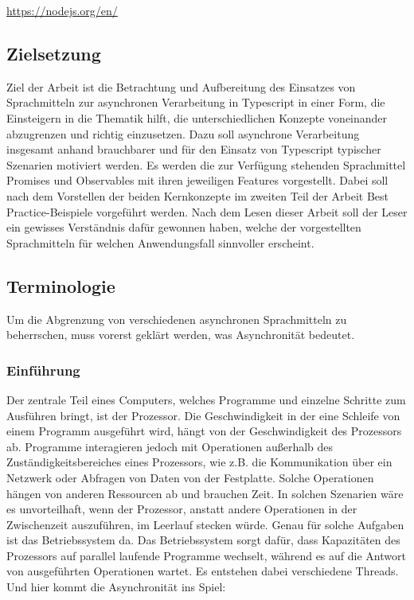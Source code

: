 \begin{center}
\url{https://nodejs.org/en/}
\end{center}

\subsection{Zielsetzung}
Ziel der Arbeit ist die Betrachtung und Aufbereitung des Einsatzes von Sprachmitteln zur asynchronen Verarbeitung in Typescript in einer Form, die Einsteigern in die Thematik hilft, die unterschiedlichen Konzepte voneinander abzugrenzen und richtig einzusetzen. Dazu soll asynchrone Verarbeitung insgesamt anhand brauchbarer und für den Einsatz von Typescript typischer Szenarien motiviert werden. Es werden die zur Verfügung stehenden Sprachmittel Promises und Observables mit ihren jeweiligen Features vorgestellt. Dabei soll nach dem Vorstellen der beiden Kernkonzepte im zweiten Teil der Arbeit \glqq Best Practice\grqq{}-Beispiele vorgeführt werden. Nach dem Lesen dieser Arbeit soll der Leser ein gewisses Verständnis dafür gewonnen haben, welche der vorgestellten Sprachmitteln für welchen Anwendungsfall sinnvoller erscheint. 

\subsection{Terminologie}
Um die Abgrenzung von verschiedenen asynchronen Sprachmitteln zu beherrschen, muss vorerst geklärt werden, was Asynchronität bedeutet.

\subsubsection{Einführung}
Der zentrale Teil eines Computers, welches Programme und einzelne Schritte zum Ausführen bringt, ist der Prozessor. Die Geschwindigkeit in der eine Schleife von einem Programm ausgeführt wird, hängt von der Geschwindigkeit des Prozessors ab. Programme interagieren jedoch mit Operationen außerhalb des Zuständigkeitsbereiches eines Prozessors, wie z.B. die Kommunikation über ein Netzwerk oder Abfragen von Daten von der Festplatte. Solche Operationen hängen von anderen Ressourcen ab und brauchen Zeit. In solchen Szenarien wäre es unvorteilhaft, wenn der Prozessor, anstatt andere Operationen in der Zwischenzeit auszuführen, im Leerlauf stecken würde. Genau für solche Aufgaben ist das Betriebssystem da. Das Betriebssystem sorgt dafür, dass Kapazitäten des Prozessors auf parallel laufende Programme wechselt, während es auf die Antwort von ausgeführten Operationen wartet. Es entstehen dabei verschiedene \glqq Threads\grqq{}. Und hier kommt die Asynchronität ins Spiel:

